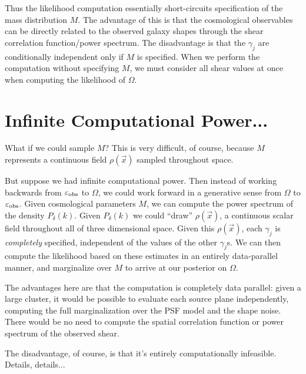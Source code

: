 \documentclass[12pt]{article}
\begin{document}
Thus the likelihood computation essentially short-circuits specification of
the mass distribution $M$.  The advantage of this is that the cosmological
observables can be directly related to the observed galaxy shapes through
the shear correlation function/power spectrum.  The disadvantage is that
the $\gamma_j$ are conditionally independent only if $M$ is specified.
When we perform the computation without specifying $M$, we must consider
all shear values at once when computing the likelihood of $\Omega$.

\section{Infinite Computational Power...}
What if we could sample $M$?  This is very difficult, of course,
because $M$ represents a continuous field $\rho(\vec{x})$ sampled
throughout space.

But suppose we had infinite computational power.  Then instead of working
backwards from $\varepsilon_{\rm obs}$ to $\Omega$, we could work forward
in a generative sense from $\Omega$ to $\varepsilon_{\rm obs}$.  Given
cosmological parameters $M$, we can compute the power spectrum of the
density $P_\delta(k)$.  Given $P_\delta(k)$ we could ``draw''
$\rho(\vec{x})$, a continuous scalar field throughout all of three dimensional
space.  Given this $\rho(\vec{x})$, each $\gamma_j$ is {\it completely}
specified, independent of the values of the other $\gamma_j$s.  We can
then compute the likelihood based on these estimates in an entirely
data-parallel manner, and marginalize over $M$ to arrive at our posterior
on $\Omega$.

The advantages here are that the computation is completely data parallel:
given a large cluster, it would be possible to evaluate each source
plane independently, computing the full marginalization over the PSF
model and the shape noise.  There would be no need to compute the
spatial correlation function or power spectrum of the observed shear.

The disadvantage, of course, is that it's entirely computationally infeasible.
Details, details...

%

\end{document}
